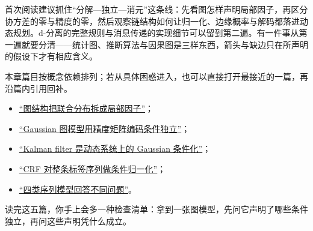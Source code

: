 首次阅读建议抓住``分解—独立—消元''这条线：先看图怎样声明局部因子，再区分协方差的零与精度的零，然后观察链结构如何让归一化、边缘概率与解码都落进动态规划。d-分离的完整规则与消息传递的实现细节可以留到第二遍。有一件事从第一遍就要分清——统计图、推断算法与因果图是三样东西，箭头与缺边只在所声明的假设下才有相应含义。

本章篇目按概念依赖排列；若从具体困惑进入，也可以直接打开最接近的一篇，再沿篇内引用回补。

\begin{itemize}
\tightlist
\item \hyperref[sec:13-Machine-Learning/07-Graphical-and-Sequential-Models/01]{``图结构把联合分布拆成局部因子''}；
\item \hyperref[sec:13-Machine-Learning/07-Graphical-and-Sequential-Models/02]{``Gaussian 图模型用精度矩阵编码条件独立''}；
\item \hyperref[sec:13-Machine-Learning/07-Graphical-and-Sequential-Models/03]{``Kalman filter 是动态系统上的 Gaussian 条件化''}；
\item \hyperref[sec:13-Machine-Learning/07-Graphical-and-Sequential-Models/04]{``CRF 对整条标签序列做条件归一化''}；
\item \hyperref[sec:13-Machine-Learning/07-Graphical-and-Sequential-Models/05]{``四类序列模型回答不同问题''}。
\end{itemize}

读完这五篇，你手上会多一种检查清单：拿到一张图模型，先问它声明了哪些条件独立，再问这些声明凭什么成立。
